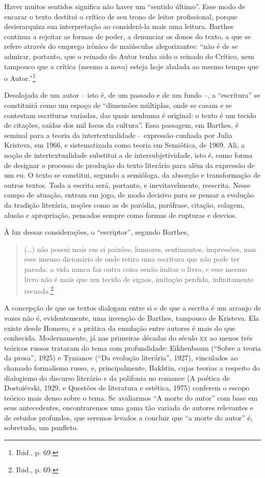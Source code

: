 Haver muitos sentidos significa não haver um ``sentido último''. Esse
modo de encarar o texto destitui o crítico de seu trono de leitor
profissional, porque desierarquiza sua interpretação ao considerá-la
mais uma leitura. Barthes continua a rejeitar as formas de poder, a
denunciar os donos do texto, a que se refere através do emprego irônico
de maiúsculas alegorizantes: ``não é de se admirar, portanto, que o
reinado do Autor tenha sido o reinado do Crítico, nem tampouco que a
crítica (mesmo a nova) esteja hoje abalada ao mesmo tempo que o
Autor.''\footnote{Ibid., p. 69.}

Desalojada de um autor -- isto é, de um passado e de um fundo --, a
``escritura'' se constituirá como um espaço de ``dimensões múltiplas,
onde se casam e se contestam escrituras variadas, das quais nenhuma é
original: o texto é um tecido de citações, saídas dos mil focos da
cultura''. Essa passagem, em Barthes, é seminal para a teoria da
intertextualidade -- expressão cunhada por Julia Kristeva, em 1966, e
sistematizada como teoria em Semiótica, de 1969. Ali, a noção de
intertextualidade substitui a de intersubjetividade, isto é, como forma
de designar o processo de produção do texto literário para além da
expressão de um eu. O texto se constitui, segundo a semióloga, da
absorção e transformação de outros textos. Toda a escrita será,
portanto, e inevitavelmente, reescrita. Nesse campo de atuação, entram
em jogo, de modo decisivo para se pensar a evolução da tradição
literária, noções como as de paródia, paráfrase, citação, colagem,
alusão e apropriação, pensadas sempre como formas de rupturas e desvios.

À luz dessas considerações, o ``escriptor'', segundo Barthes,

\begin{quote}
(\ldots{}) não possui mais em si paixões, humores, sentimentos, impressões,
mas esse imenso dicionário de onde retira uma escritura que não pode ter
parada: a vida nunca faz outra coisa senão imitar o livro, e esse mesmo
livro não é mais que um tecido de signos, imitação perdida,
infinitamente recuada.\footnote{Ibid., p. 69.}
\end{quote}

A concepção de que os textos dialogam entre si e de que a escrita é um
arranjo de vozes não é, evidentemente, uma invenção de Barthes, tampouco
de Kristeva. Ela existe desde Homero, e a prática da emulação entre
autores é mais do que conhecida. Modernamente, já nas primeiras décadas
do século \textsc{xx} ao menos três teóricos russos trataram do tema com
profundidade: Eikhenbaum (``Sobre a teoria da prosa'', 1925) e Tynianov
(``Da evolução literária'', 1927), vinculados ao chamado formalismo
russo, e, principalmente, Bakhtin, cujas teorias a respeito do
dialogismo do discurso literário e da polifonia no romance (A poética de
Dostoiévski, 1929, e Questões de literatura e estética, 1975) conferem o
escopo teórico mais denso sobre o tema. Se avaliarmos ``A morte do
autor'' com base em seus antecedentes, encontraremos uma gama tão
variada de autores relevantes e de estudos profundos, que seremos
levados a concluir que ``a morte do autor'' é, sobretudo, um panfleto.

